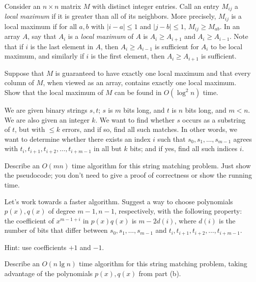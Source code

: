 \begin{qunlist}
\pagebreak
{}

Consider an $n\times n$ matrix $M$ with distinct integer entries. Call an entry $M_{ij}$ a \emph{local maximum} if it is greater than all of its neighbors. More precisely, $M_{ij}$ is a local maximum if for all $a,b$ with $|i-a|\le 1$ and $|j-b|\le 1$, $M_{ij} \ge M_{ab}$. In an array $A$, say that $A_i$ is a \emph{local maximum} of $A$ is $A_i \ge A_{i+1}$ and $A_i \ge A_{i-1}$. Note that if $i$ is the last element in $A$, then $A_i \geq A_{i-1}$ is sufficient for $A_i$ to be local maximum, and similarly if $i$ is the first element, then $A_i \geq A_{i+1}$ is sufficient.

Suppose that $M$ is guaranteed to have exactly one local maximum and that every column of $M$, when viewed as an array, contains exactly one local maximum. Show that the local maximum of $M$ can be found in $O(\log^2 n)$ time. 




\pagebreak
{}

We are given binary strings $s,t$; $s$ is $m$ bits long, and $t$ is $n$ bits long,
and $m<n$.
We are also given an integer $k$.
We want to find whether $s$ occurs as a substring of $t$,
but with $\le k$ errors, and if so, find all such matches.
In other words, we want to determine whether there exists an index $i$
such that $s_0,s_1,\dots,s_{m-1}$ agrees with
$t_i,t_{i+1},t_{i+2},\dots,t_{i+m-1}$ in all but $k$ bits; and if yes,
find all such indices $i$.
\begin{qparts}
\item Describe an $O(mn)$ time algorithm for this string matching problem.
Just show the pseudocode; you don't need to give a proof of correctness
or show the running time.

\item Let's work towards a faster algorithm.
Suggest a way to choose polynomials $p(x),q(x)$ of degree $m-1,n-1$,
respectively, with the following property:
the coefficient of $x^{m-1+i}$ in $p(x)q(x)$ is $m-2d(i)$,
where $d(i)$ is the number of bits that differ between
$s_0,s_1,\dots,s_{m-1}$ and $t_i,t_{i+1},t_{i+2},\dots,t_{i+m-1}$.

Hint: use coefficients $+1$ and $-1$.

\item Describe an $O(n \lg n)$ time algorithm for this string matching problem,
taking advantage of the polynomials $p(x),q(x)$ from part (b).


\end{qparts}
\end{qunlist}
